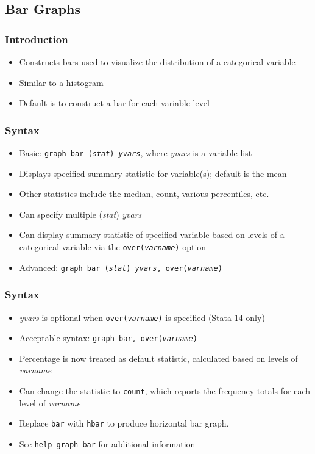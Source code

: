 \documentclass{beamer}
\begin{document}
\subsection{Bar Graphs}

\begin{frame}
	\frametitle{Introduction}
		\begin{itemize}
			\item Constructs bars used to visualize the distribution of a categorical variable
			\item Similar to a histogram
			\item Default is to construct a bar for each variable level
		\end{itemize}
\end{frame}

\begin{frame}
	\frametitle{Syntax}
		\begin{itemize}
			\item Basic: \texttt{graph bar (\textit{stat}) \textit{yvars}}, where \textit{yvars} is a variable list
			\item Displays specified summary statistic for variable(s); default is the mean
			\item Other statistics include the median, count, various percentiles, etc.
			\item Can specify multiple (\textit{stat}) \textit{yvars}
			\item Can display summary statistic of specified variable based on levels of a categorical variable via the \texttt{over(\textit{varname})} option
			\item Advanced: \texttt{graph bar (\textit{stat}) \textit{yvars}, over(\textit{varname})}
		\end{itemize}
\end{frame}

\begin{frame}
	\frametitle{Syntax}
		\begin{itemize}
			\item \textit{yvars} is optional when \texttt{over(\textit{varname})} is specified (Stata 14 only)
			\item Acceptable syntax: \texttt{graph bar, over(\textit{varname})}
			\item Percentage is now treated as default statistic, calculated based on levels of \textit{varname}
			\item Can change the statistic to \texttt{count}, which reports the frequency totals for each level of \textit{varname}
			\item Replace \texttt{bar} with \texttt{hbar} to produce horizontal bar graph.
			\item See \texttt{help graph bar} for additional information
		\end{itemize}
\end{frame}
\end{document}
